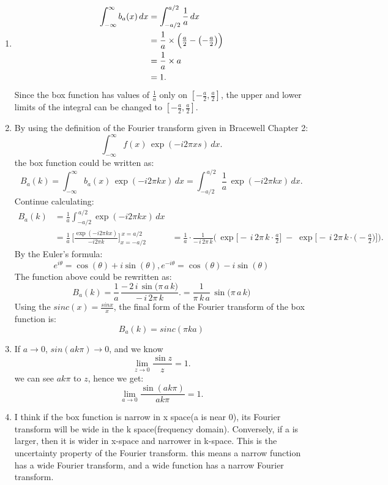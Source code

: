 \documentclass[12pt]{article}
\begin{document}
\subsection{}
\begin{enumerate}[label=(\roman*)]
  \item \[
\begin{aligned}
\int_{-\infty}^{\infty} b_a(x)\,dx 
&= \int_{-a/2}^{a/2} \frac{1}{a}\,dx  \\
&= \frac{1}{a} \times \Bigl(\tfrac{a}{2} - \bigl(-\tfrac{a}{2}\bigr)\Bigr) \\
&= \frac{1}{a} \times a \\
&= 1.
\end{aligned}
\]
Since the box function has values of \(\frac{1}{a}\) only on \([-\frac{a}{2},\frac{a}{2}]\), the upper and lower limits of the integral can be changed to \([-\frac{a}{2},\frac{a}{2}]\).
  \item
  By using the definition of the Fourier transform given in Bracewell Chapter 2:
  \[
    \int_{-\infty}^{\infty} f(x)\,\exp(-i2 \pi xs)\,dx.
    \]
  the box function could be written as:
    \[
B_a(k) 
= \int_{-\infty}^{\infty} b_a(x)\,\exp(-i2\pi kx)\,dx 
= \int_{-a/2}^{\,a/2} \frac{1}{a}\,\exp(-i2\pi kx)\,dx.
\]
Continue calculating:
\[
\begin{aligned}
B_a(k)
&= \frac{1}{a} \int_{-a/2}^{\,a/2} \exp(-i2\pi k x)\,dx \\[6pt]
&= \frac{1}{a} \,\biggl[\frac{\exp(-i2\pi kx)}{-i2\pi k}\biggr]_{x=-a/2}^{\,x=a/2}
&= \frac{1}{a} \cdot \frac{1}{-\,i\,2\pi\,k}
\bigl(\,\exp\bigl[-\,i\,2\pi\,k \cdot \tfrac{a}{2}\bigr]
 \;-\; \exp\bigl[-\,i\,2\pi\,k \cdot \bigl(-\tfrac{a}{2}\bigr)\bigr]\bigr).
\end{aligned}
\]
By the Euler's formula:
\[
e^{i\theta} = \cos(\theta) + i \sin(\theta), e^{-i\theta} = \cos(\theta) - i \sin(\theta)
\]
The function above could be rewritten as:
\[
B_a(k) 
= \frac{1}{a} \,\frac{-\,2\,i\,\sin\bigl(\pi\,a\,k\bigr)}{-\,i\,2\pi\,k}. = \frac{1}{\pi\,k\,a}\,\sin\bigl(\pi\,a\,k\bigr)
\]
Using the \(sinc(x) = \frac{sinx}{x}\), the final form of the Fourier transform of the box function is:
\[B_a(k) = sinc(\pi k a)\]

  \item 
  If \(a \rightarrow 0\), \(sin(ak\pi)\rightarrow 0\), and we know 
  \[
\lim_{z \to 0} \frac{\sin z}{z} = 1.
\]
 we can see \(ak\pi\) to \(z\), hence we get:
  \[
\lim_{a \to 0} \frac{\sin (ak\pi)}{ak\pi} = 1.
\]
  \item 
  I think if the box function is narrow in x space(a is near 0),  its Fourier transform will be wide in the k space(frequency domain). Conversely, if a is larger, then it is wider in x-space and narrower in k-space. This is the uncertainty property of the Fourier transform. this means a narrow function has a wide Fourier transform, and a wide function has a narrow Fourier transform.
\end{enumerate}
\end{document}
